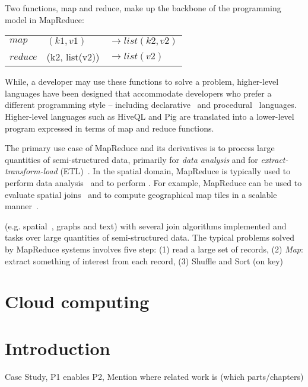 \documentclass[11pt, oneside]{report}   	%
\begin{document}
Two functions, map and reduce, make up the backbone of the programming model in MapReduce:

\begin{tabular}{l l l}
$map$ & $(k1, v1)$ & $\rightarrow list(k2, v2)$\\ 
$reduce$ & (k2, list(v2)) & $\rightarrow list(v2)$ \\
\end{tabular}


While, a developer may use these functions to solve a problem, higher-level languages have been designed that accommodate developers who prefer a different programming style -- including declarative~\cite{thusoo2009hive} and procedural~\cite{olston2008pig,eldawy2014pigeon} languages. Higher-level languages such as HiveQL and Pig are translated into a lower-level program expressed in terms of map and reduce functions.

The primary use case of MapReduce and its derivatives is to process large quantities of semi-structured data, primarily for \emph{data analysis} and for \emph{extract-transform-load} (ETL)~\cite{stonebraker2010friendsorfoes}. In the spatial domain, MapReduce is typically used to perform data analysis~\cite{aji2012largespatial} and to perform . For example, MapReduce can be used to evaluate spatial joins~\cite{zhang2009mapreduce} and to compute geographical map tiles in a scalable manner~\cite{dean2009lessons}.



 (e.g. spatial~{}, graphs and text{}) with several join algorithms implemented and  tasks over large quantities of semi-structured data. The typical problems solved by MapReduce systems involves five step: (1) read a large set of records, (2) \emph{Map}: extract something of interest from each record, (3) Shuffle and Sort (on key)


\chapter{Cloud computing}



\chapter{Introduction}

Case Study, P1 enables P2, Mention where related work is (which parts/chapters)
\end{document}
